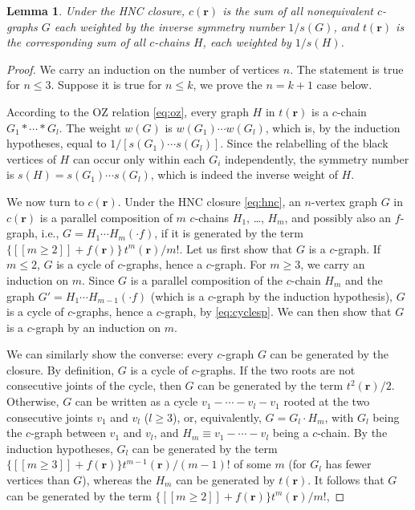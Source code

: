 \documentclass[notitlepage,preprint]{revtex4-1}
\newtheorem{lemm}[thrm]{Lemma}
\newcommand{\vct}[1]{\mathbf{#1}}
\providecommand{\vr}{} %
\renewcommand{\vr}{\vct{r}}
\newcommand{\llbra}{[\![}
\newcommand{\llket}{]\!]}
\begin{document}
\begin{lemm}
Under the HNC closure,
%
$c(\vr)$
  is the sum of all nonequivalent $c$-graphs $G$
  each weighted by
  the inverse symmetry number
  $1/s(G)$,
%
and $t(\vr)$ is the corresponding sum of all
  $c$-chains $H$, each weighted by $1/s(H)$.
\end{lemm}
%
%
%
\begin{proof}
%
We carry an induction on the number of vertices $n$.
%
The statement is true for $n \le 3$.
%
Suppose it is true for $n \le k$,
  we prove the $n = k + 1$ case below.

According to the OZ relation \eqref{eq:oz},
  every graph $H$ in $t(\vr)$ is
  a $c$-chain $G_1 * \cdots * G_l$.
%
The weight $w(G)$ is
  $w(G_1) \cdots w(G_l)$,
  which is, by the induction hypotheses, equal to
  $1/\left[ s(G_1) \cdots s(G_l) \right]$.
%
Since the relabelling of the black vertices of $H$
  can occur only within each $G_i$ independently,
  the symmetry number is
  $s(H) = s(G_1) \cdots s(G_l)$,
  which is indeed the inverse weight of $H$.

We now turn to $c(\vr)$.
%
Under the HNC closure \eqref{eq:hnc},
  an $n$-vertex graph $G$ in $c(\vr)$ is
  a parallel composition of
  $m$ $c$-chains $H_1$, \dots, $H_m$,
  and possibly also an $f$-graph,
  i.e., $G = H_1 \cdots H_m (\cdot f)$,
  if it is generated by the term
  $\big\{\llbra m \ge 2 \llket + f(\vr)\big\} \, t^m(\vr) / m!$.
%
Let us first show that $G$ is a $c$-graph.
%
If $m \le 2$,
  $G$ is a cycle of $c$-graphs,
  hence a $c$-graph.
%
For $m \ge 3$, we carry an induction on $m$.
%
Since $G$ is a parallel composition of the $c$-chain $H_m$
  and the graph
  $G' = H_1 \cdots H_{m-1} (\cdot f)$ (which is a $c$-graph by the induction hypothesis),
  $G$ is a cycle of $c$-graphs, hence a $c$-graph,
  by \eqref{eq:cyclesp}.
%
We can then show that $G$ is a $c$-graph by an induction on $m$.



We can similarly show the converse:
  every $c$-graph $G$ can be generated by the closure.
%
By definition, $G$ is a cycle of $c$-graphs.
%
If the two roots are not consecutive joints of the cycle,
  then $G$ can be generated by the term $t^2(\vr)/2$.
%
Otherwise, $G$ can be written as a cycle
  $v_1 - \cdots - v_l - v_1$
  rooted at the two consecutive joints $v_1$ and $v_l$
  ($l \ge 3$),
%
or, equivalently, $G = G_l \cdot H_m$,
  with
    $G_l$ being the $c$-graph between $v_1$ and $v_l$,
  and
    $H_m \equiv v_1 - \cdots - v_l$
    being a $c$-chain.
%
By the induction hypotheses,
  $G_l$ can be generated by the term
  $\big\{ \llbra m \ge 3 \llket +f(\vr) \big\} t^{m - 1}(\vr) / (m - 1)!$
  of some $m$ (for $G_l$ has fewer vertices than $G$),
whereas
  the $H_m$ can be generated by $t(\vr)$.
%
It follows that
  $G$ can be generated by the term
  $\big\{ \llbra m \ge 2 \llket  + f(\vr)\big\} t^{m}(\vr) / m! $,
%




\end{proof}
\end{document}
